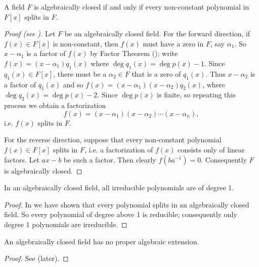 \begin{theorem}\label{thrm-algebraically-closed-iff-polynomials-split-in-field}
    A field $F$ is algebraically closed if and only if every non-constant polynomial in $F[x]$ splits in $F$.
\end{theorem}
\begin{proof}[Proof (see {\cite[Theorem 21.25]{judson_beezer_2022}})]
    Let $F$ be an algebraically closed field. For the forward direction, if $f(x) \in F[x]$ is non-constant, then $f(x)$ must have a zero in $F$, say $\alpha_1$. So $x-\alpha_1$ is a factor of $f(x)$ by Factor Theorem (); write $f(x) = (x-\alpha_1)q_1(x)$ where $\deg q_1(x) = \deg p(x) - 1$. Since $q_1(x) \in F[x]$, there must be a $\alpha_2\in F$ that is a zero of $q_1(x)$. Thus $x-\alpha_2$ is a factor of $q_1(x)$ and so $f(x) = (x-\alpha_1)(x-\alpha_2)q_2(x)$, where $\deg q_2(x) = \deg p(x) - 2$. Since $\deg p(x)$ is finite, so repeating this process we obtain a factorization
    \[
        f(x) = (x-\alpha_1)(x-\alpha_2)\cdots(x-\alpha_n),
    \]
    i.e. $f(x)$ splits in $F$.

    For the reverse direction, suppose that every non-constant polynomial $f(x) \in F[x]$ splits in $F$, i.e. a factorization of $f(x)$ consists only of linear factors. Let $ax-b$ be such a factor. Then clearly $f(ba^{-1}) = 0$. Consequently $F$ is algebraically closed.
\end{proof}

\begin{corollary}\label{corollary-in-algebraically-closed-field-irreducible-polynomial-is-degree-1}
    In an algebraically closed field, all irreducible polynomials are of degree 1.
\end{corollary}
\begin{proof}
    In  we have shown that every polynomial splits in an algebraically closed field. So every polynomial of degree above 1 is reducible; consequently only degree 1 polynomials are irreducible.
\end{proof}

\begin{corollary}\label{corollary-algebraically-closed-field-has-no-proper-algebraic-extension}
    An algebraically closed field has no proper algebraic extension.
\end{corollary}
\begin{proof}
    See  (later).
\end{proof}

